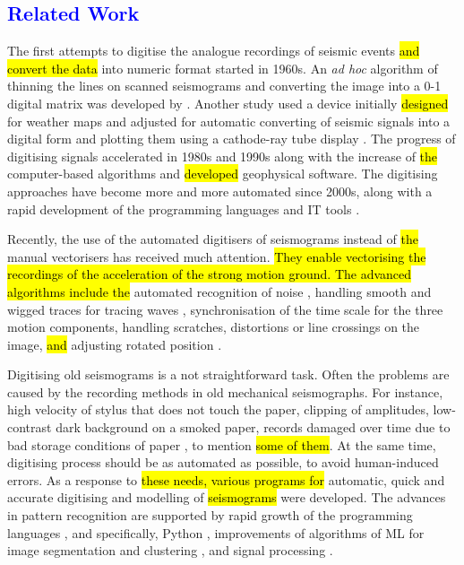 \documentclass[sensors,article,submit,moreauthors,pdftex]{Definitions/mdpi}
\begin{document}
\subsection{\textcolor{blue}{Related Work}}
The first attempts to digitise the analogue recordings of seismic events \hl{and convert the data }into numeric format started in 1960s. An \emph{ad hoc} algorithm of thinning the lines on scanned seismograms and converting the image into a 0-1 digital matrix was developed by \cite{Jarosch1975}. Another study used a device initially \hl{designed }for weather maps and adjusted for automatic converting of seismic signals into a digital form\hl{ }and plotting them using a cathode-ray tube display \cite{AdamsAllen1961}. The progress of digitising signals accelerated in 1980s \citep{AspinallLatchman,CrouseMatuschka1983} and 1990s \citep{Scherbaum1996a,NorlundGriffiths1993,McGee1995,Harjesetal1993,Scherbaum1996b,Scherbaum1996c} along with the increase of \hl{the }computer-based algorithms and \hl{developed }geophysical software. The digitising approaches have become more and more automated since 2000s, along with a rapid development of the programming languages and IT tools \cite{Bietal2016,Ishiietal2015,Schenke,Wangetal2014}. 
 
Recently, the use of the automated digitisers of seismograms\hl{ }instead of \hl{the }manual vectorisers has received much attention. \hl{They enable vectorising the recordings of the acceleration of the strong motion ground. The advanced algorithms include the }automated recognition of noise \cite{CrouseMatuschka1983}, handling smooth and wigged traces\hl{ }for tracing waves\hl{ }\cite{Bietal2016}, synchronisation of the time scale for the three motion components, handling scratches, distortions or line crossings on the image, \hl{and }adjusting rotated position \cite{Trifunacetal1999}. 

Digitising old seismograms is a not straightforward task. Often the problems are caused by the recording methods in old mechanical seismographs. For instance, high velocity of stylus that does not touch the paper, clipping of amplitudes, low-contrast dark background on a smoked paper, records damaged over time due to bad storage conditions of paper \cite{Baskoutasetal2000}, to mention \hl{some of them}. At the same time, digitising process should be as automated as possible, to avoid human-induced errors. As a response to \hl{these needs, various programs for }automatic, quick and accurate digitising and modelling of\hl{ seismograms }were developed. The advances\hl{ }in pattern recognition are supported by rapid growth of the programming languages \cite{Esmaili,analytica2030006,Lemenkova201991,Lemenkova2019100,Lemenkov202103}, and specifically, Python \cite{Cox,Stoneback, Lemenkova201989}, improvements of algorithms of \ac{ML}\hl{ }for image segmentation and clustering \cite{Jenkins,signals1010005,DebeirDecaestecker,signals2030037,Debeir2008}, and signal processing \cite{Foucart,Debeiretal2019}. 
\end{document}
